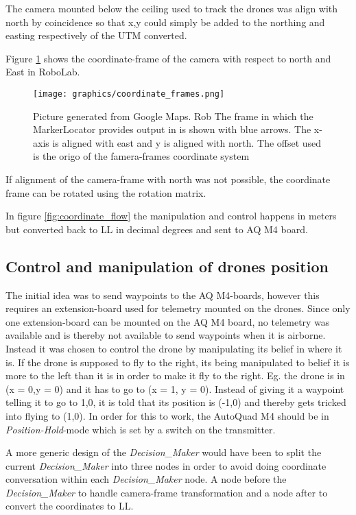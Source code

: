 The camera mounted below the ceiling used to track the drones was align with north by coincidence so that x,y could simply be added to the northing and easting respectively of the \ac{UTM} converted.

Figure \ref{fig:coordinate_frames} shows the coordinate-frame of the camera with respect to north and East in RoboLab.

\begin{figure}[H]
    \center
    \texttt{[image: graphics/coordinate\_frames.png]}
  	\caption{Picture generated from Google Maps. Rob The frame in which the MarkerLocator provides output in is shown with blue arrows. The x-axis is aligned with east and y is aligned with north. The offset used is the origo of the famera-frames coordinate system}
    \label{fig:coordinate_frames}
\end{figure}

If alignment of the camera-frame with north was not possible, the coordinate frame can be rotated using the rotation matrix\cite{Choset_2005_5167}.

In figure \ref{fig:coordinate_flow} the manipulation and control happens in meters but converted back to \ac{LL} in decimal degrees and sent to AQ M4 board.

\subsection{Control and manipulation of drones position}
The initial idea was to send waypoints to the AQ M4-boards, however this requires an extension-board used for telemetry mounted on the drones. Since only one extension-board can be mounted on the AQ M4 board, no telemetry was available and is thereby not available to send waypoints when it is airborne. \\
Instead it was chosen to control the drone by manipulating its belief in where it is.
If the drone is supposed to fly to the right, its being manipulated to belief it is more to the left than it is in order to make it fly to the right. Eg. the drone is in (x = 0,y = 0) and it has to go to (x = 1, y = 0).
Instead of giving it a waypoint telling it to go to 1,0, it is told that its position is (-1,0) and thereby gets tricked into flying to (1,0). In order for this to work, the AutoQuad M4 should be in \textit{Position-Hold}-mode which is set by a switch on the transmitter.


A more generic design of the \textit{Decision\_Maker} would have been to split the current \textit{Decision\_Maker} into three nodes in order to avoid doing coordinate conversation within each \textit{Decision\_Maker} node. A node before the \textit{Decision\_Maker} to handle camera-frame transformation and a node after to convert the coordinates to \ac{LL}.